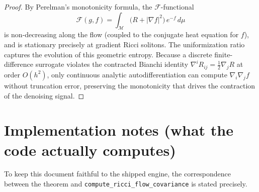 \documentclass[11pt]{article}
\begin{document}
\begin{proof}
By Perelman's monotonicity formula, the $\mathcal{F}$-functional
\[
\mathcal{F}(g, f) = \int_{\mathcal{M}} \big(R + |\nabla f|^2\big)\, e^{-f}\, d\mu
\]
is non-decreasing along the flow (coupled to the conjugate heat equation for
$f$), and is stationary precisely at gradient Ricci solitons. The uniformization
ratio captures the evolution of this geometric entropy. Because a discrete
finite-difference surrogate violates the contracted Bianchi identity
$\nabla^i R_{ij} = \tfrac12 \nabla_j R$ at order $O(h^2)$, only continuous
analytic autodifferentiation can compute $\nabla_i \nabla_j f$ without truncation
error, preserving the monotonicity that drives the contraction of the denoising
signal.
\end{proof}

\section*{Implementation notes (what the code actually computes)}

To keep this document faithful to the shipped engine, the correspondence between
the theorem and \texttt{compute\_ricci\_flow\_covariance} is stated precisely.
\end{document}
